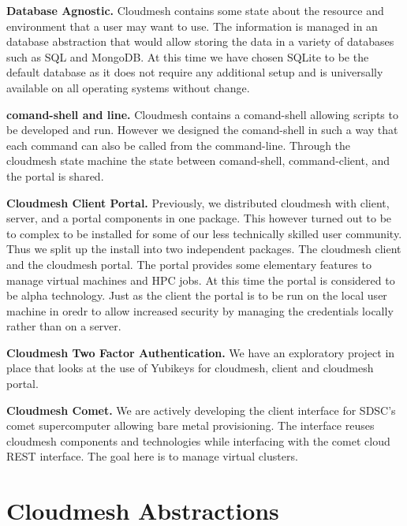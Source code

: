 \begin{description}
\item{\bf Database Agnostic.} Cloudmesh contains some state about the
resource and environment that a user may want to use. The information
is managed in an database abstraction that would allow storing the
data in a variety of databases such as SQL and MongoDB. At this time
we have chosen SQLite to be the default database as it does not
require any additional setup and is universally available on all
operating systems without change.

\item{\bf comand-shell and line.} Cloudmesh contains a comand-shell
allowing scripts to be developed and run. However we designed the
comand-shell in such a way that each command can also be called from
the command-line. Through the cloudmesh state machine the state
between comand-shell, command-client, and the portal is shared.

\item{\bf Cloudmesh Client Portal.} Previously, we distributed
cloudmesh with client, server, and a portal components in one
package. This however turned out to be to complex to be installed for
some of our less technically skilled user community. Thus we split up
the install into two independent packages. The cloudmesh client and
the cloudmesh portal. The portal provides some elementary features to
manage virtual machines and HPC jobs. At this time the portal is
considered to be alpha technology. Just as the client the portal is to
be run on the local user machine in oredr to allow increased security
by managing the credentials locally rather than on a server.

\item{\bf Cloudmesh Two Factor Authentication.} We have an
exploratory project in place that looks at the use of Yubikeys for
cloudmesh, client and cloudmesh portal.

\item{\bf Cloudmesh Comet.} We are actively developing the client
interface for SDSC’s comet supercomputer allowing bare metal
provisioning. The interface reuses cloudmesh components and
technologies while interfacing with the comet cloud REST
interface. The goal here is to manage virtual clusters.

\end{description}




\section{Cloudmesh Abstractions}

